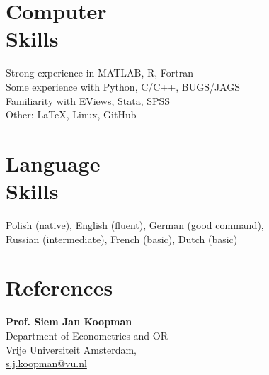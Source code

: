 \documentclass[margin,line]{resume}
\newlength\Colsep
\begin{document}
\begin{resume}


 
 	

   \section{\mysidestyle Computer\\ Skills} 
   Strong experience in MATLAB, R, Fortran   \vspace{1mm}\\
   Some experience with Python, C/C++, BUGS/JAGS \vspace{1mm}\\
	Familiarity with EViews, Stata, SPSS \vspace{1mm} \\
	Other: \LaTeX, Linux, GitHub  

   \section{\mysidestyle Language\\ Skills}  
	Polish (native), English (fluent),  German (good command),    \\
    Russian (intermediate),  French (basic),  Dutch (basic)

 
    
\section{\mysidestyle References} 




\noindent
\begin{minipage}[t][6cm][t]{\dimexpr0.5\textwidth-0.5\Colsep\relax}
\textbf{Prof. Siem Jan Koopman} \\    
Department of Econometrics and OR\\
Vrije Universiteit Amsterdam, \\ \url{s.j.koopman@vu.nl}
\vspace{5mm}


\end{minipage}
\end{resume}
\end{document}
